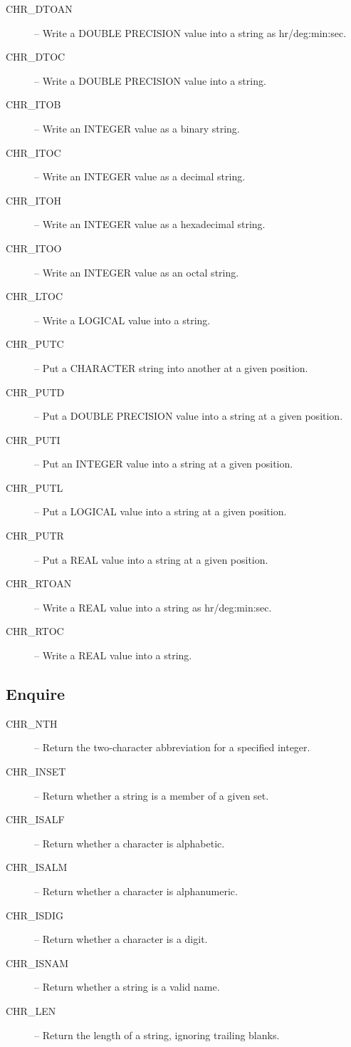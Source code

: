 \documentclass[twoside,11pt,nolof]{starlink}
\begin{document}
\begin{description}
\item [CHR\_DTOAN] -- Write a DOUBLE PRECISION value into a string as
hr/deg:min:sec.
\item [CHR\_DTOC] -- Write a DOUBLE PRECISION value into a string.
\item [CHR\_ITOB] -- Write an INTEGER value as a binary string.
\item [CHR\_ITOC] -- Write an INTEGER value as a decimal string.
\item [CHR\_ITOH] -- Write an INTEGER value as a hexadecimal string.
\item [CHR\_ITOO] -- Write an INTEGER value as an octal string.
\item [CHR\_LTOC] -- Write a LOGICAL value into a string.
\item [CHR\_PUTC] -- Put a CHARACTER string into another at a given position.
\item [CHR\_PUTD] -- Put a DOUBLE PRECISION value into a string at a given position.
\item [CHR\_PUTI] -- Put an INTEGER value into a string at a given position.
\item [CHR\_PUTL] -- Put a LOGICAL value into a string at a given position.
\item [CHR\_PUTR] -- Put a REAL value into a string at a given position.
\item [CHR\_RTOAN] -- Write a REAL value into a string as hr/deg:min:sec.
\item [CHR\_RTOC] -- Write a REAL value into a string.
\end {description}


\subsection {Enquire}

\begin{description}
\item [CHR\_NTH] -- Return the two-character abbreviation for a specified
integer.
\item [CHR\_INSET] -- Return whether a string is a member of a given set.
\item [CHR\_ISALF] -- Return whether a character is alphabetic.
\item [CHR\_ISALM] -- Return whether a character is alphanumeric.
\item [CHR\_ISDIG] -- Return whether a character is a digit.
\item [CHR\_ISNAM] -- Return whether a string is a valid name.
\item [CHR\_LEN] -- Return the length of a string, ignoring trailing blanks.
\end{description}
\end{document}

